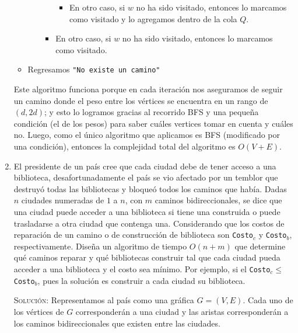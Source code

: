 \documentclass[letterpaper,11pt]{article}
\begin{document}
\begin{enumerate}
\begin{itemize}
\begin{itemize}
\begin{itemize}
\begin{itemize}
                    \item En otro caso, si $w$ no ha sido visitado, entonces 
                    lo marcamos como visitado y lo agregamos dentro de la 
                    cola $Q$.
                \end{itemize}

                \item En otro caso, si $w$ no ha sido visitado, entonces lo 
                marcamos como visitado.
            \end{itemize}
        \end{itemize}

        \item Regresamos \texttt{"No existe un camino"}
    \end{itemize}

    Este algoritmo funciona porque en cada iteración nos aseguramos de seguir 
    un camino donde el peso entre los vértices se encuentra en un rango de 
    $(d, 2d)$; y esto lo logramos gracias al recorrido BFS y una pequeña 
    condición (el de los pesos) para saber cuáles vertices tomar en cuenta y 
    cuáles no. Luego, como el único algoritmo que aplicamos es BFS (modificado 
    por una condición), entonces la complejidad total del algoritmo es 
    $O(V+E)$.
    
    \item El presidente de un país cree que cada ciudad debe de tener acceso 
    a una biblioteca, desafortunadamente el país se vio afectado por un temblor
    que destruyó todas las bibliotecas y bloqueó todos los caminos que había. 
    Dadas $n$ ciudades numeradas de $1$ a $n$, con $m$ caminos bidireccionales, 
    se dice que una ciudad puede acceder a una biblioteca si tiene una construida
    o puede trasladarse a otra ciudad que contenga una. Considerando que los 
    costos de reparación de un camino o de construcción de biblioteca son 
    \texttt{Costo}$_c$ y \texttt{Costo}$_b$, respectivamente. Diseña un algoritmo 
    de tiempo $O(n + m)$ que determine qué caminos reparar y qué bibliotecas 
    construir tal que cada ciudad pueda acceder a una biblioteca y el costo sea 
    mínimo. Por ejemplo, si el \texttt{Costo}$_c \leq$ \texttt{Costo}$_b$, pues 
    la solución es construir a cada ciudad su biblioteca.

    \textsc{Solución:} Representamos al país como una gráfica $G = (V, E)$. 
    Cada uno de los vértices de $G$ corresponderán a una ciudad y las aristas 
    corresponderán a los caminos bidireccionales que existen entre las ciudades.


\end{enumerate}
\end{document}
